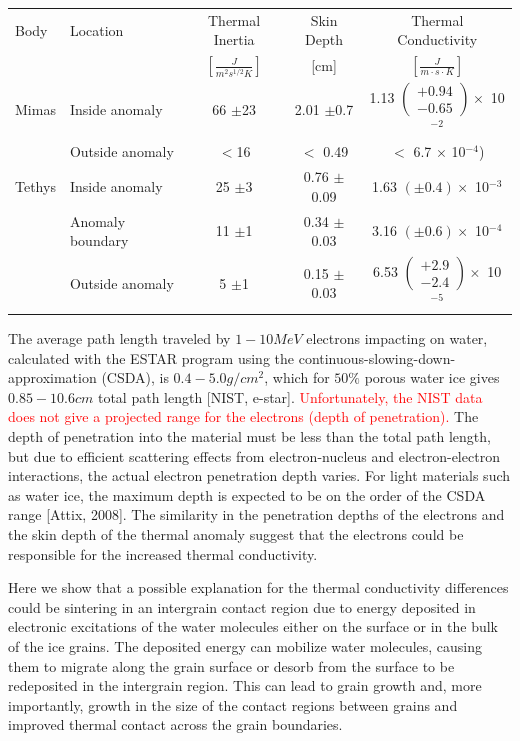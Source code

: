 \documentclass[11pt]{article} %
\begin{document}
	\begin{tabular}[c]{ l | l | c | c | c }
	Body & Location & Thermal Inertia & Skin Depth & Thermal Conductivity \\
	& & $\left[ \frac{J}{m^{2} s^{1/2} K} \right]$ & [cm] & $\left[ \frac{J}{m\cdot s\cdot K} \right]$ \\ \hline
	Mimas & Inside anomaly & 66 $\pm$23 & 2.01 $\pm$0.7 & 1.13 $\left(\substack{+0.94 \\ -0.65} \right) \times$ 10$^{-2}$ \\
		& Outside anomaly & $<$16 & $<$ 0.49 & $<$ 6.7 $\times$ 10$^{-4}$) \\ \hline
	Tethys & Inside anomaly & 25 $\pm$3 & 0.76 $\pm$0.09 & 1.63 $(\pm 0.4) \times$ 10$^{-3}$ \\
		& Anomaly boundary & 11 $\pm$1 & 0.34 $\pm$0.03 & 3.16 $(\pm 0.6) \times$ 10$^{-4}$ \\
		& Outside anomaly & 5 $\pm$1 & 0.15 $\pm$0.03 & 6.53 $\left(\substack{+2.9 \\ -2.4} \right) \times$ 10$^{-5}$ \\
	\end{tabular}

	The average path length traveled by $1 - 10 MeV$ electrons impacting on water, calculated with the ESTAR program using the continuous-slowing-down-approximation (CSDA), is $0.4-5.0 g/cm^{2}$, which for $50\%$ porous water ice gives $0.85-10.6 cm$ total path length [NIST, e-star]. \textcolor{red}{Unfortunately, the NIST data does not give a projected range for the electrons (depth of penetration).} The depth of penetration into the material must be less than the total path length, but due to efficient scattering effects from electron-nucleus and electron-electron interactions, the actual electron penetration depth varies. For light materials such as water ice, the maximum depth is expected to be on the order of the CSDA range [Attix, 2008]. The similarity in the penetration depths of the electrons and the skin depth of the thermal anomaly suggest that the electrons could be responsible for the increased thermal conductivity.  
	
	Here we show that a possible explanation for the thermal conductivity differences could be sintering in an intergrain contact region due to energy deposited in electronic excitations of the water molecules either on the surface or in the bulk of the ice grains. The deposited energy can mobilize water molecules, causing them to migrate along the grain surface or desorb from the surface to be redeposited in the intergrain region. This can lead to grain growth and, more importantly, growth in the size of the contact regions between grains and improved thermal contact  across the grain boundaries.
	
\end{document}
